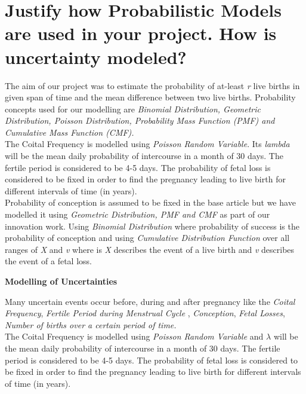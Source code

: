 \documentclass{article}
\begin{document}
\section {Justify how Probabilistic Models are used in your project. How is uncertainty modeled?}
{The aim of our project was to estimate the probability of at-least {\slshape r} live births in given span of time and the mean difference between two live births. Probability concepts used for our modelling are {\slshape Binomial Distribution, Geometric Distribution, Poisson Distribution, Probability Mass Function (PMF) and Cumulative Mass Function (CMF).}\\

The Coital Frequency is modelled using {\slshape Poisson Random Variable}. Its {\slshape lambda} will be the mean daily probability of intercourse in a month of 30 days. The fertile period is considered to be 4-5 days. The probability of fetal loss is considered to be fixed in order to find the pregnancy leading to live birth for different intervals of time (in years). \\

Probability of conception is assumed to be fixed in the base article but we have modelled it using {\slshape Geometric Distribution, PMF and CMF} as part of our innovation work. Using {\slshape Binomial Distribution} where probability of success is the probability of conception and using {\slshape Cumulative Distribution Function} over all ranges of {\slshape X} and {\slshape v} where is {\slshape X} describes the event of a live birth and {\slshape v} describes the event of a fetal loss.}\\
\begin{center}
	{\large {\bfseries Modelling of Uncertainties}}
\end{center}
Many uncertain events occur before, during and after pregnancy like the {\slshape Coital Frequency}, {\slshape Fertile Period during Menstrual Cycle} , {\slshape Conception}, {\slshape Fetal Losses}, {\slshape Number of births over a certain period of time.}\\

The Coital Frequency is modelled using {\slshape Poisson Random Variable} and {\slshape $\lambda$} will be the mean daily probability of intercourse in a month of 30 days. The fertile period is considered to be 4-5 days. The probability of fetal loss is considered to be fixed in order to find the pregnancy leading to live birth for different intervals of time (in years).\\
\end{document}
